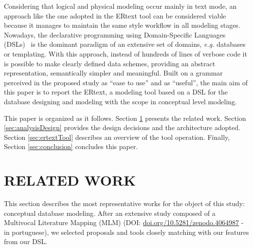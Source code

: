 \documentclass[a4paper,twoside,anonymous]{article}
\begin{document}
Considering that logical and physical modeling occur mainly in text mode, an approach like the one adopted in the ERtext tool can be considered viable because it manages to maintain the same style workflow in all modeling stages.
Nowadays, the declarative programming using Domain-Specific Languages (DSLs)~\cite{Kelly08} is the dominant paradigm of an extensive set of domains, \textit{e.g.} databases or templating.
With this approach, instead of hundreds of lines of verbose code it is possible to make clearly defined data schemes, providing an abstract representation, semantically simpler and meaningful.
Built on a grammar perceived in the proposed study as ``ease to use'' and as ``useful'', the main aim of this paper is to report the ERtext, a modeling tool based on a DSL for the database designing and modeling with the scope in conceptual level modeling.

This paper is organized as it follows.
Section \ref{sec:relatedWork} presents the related work. 
Section \ref{sec:analysisDesign} provides the design decisions and the architecture adopted. %
Section \ref{sec:ertextTool} describes an overview of the tool operation.
Finally, Section \ref{sec:conclusion} concludes this paper.

\section{\uppercase{Related Work}} 
\label{sec:relatedWork}

This section describes the most representative works for the object of this study: conceptual database modeling.
After an extensive study composed of a Multivocal Literature Mapping (MLM) (DOI: \url{doi.org/10.5281/zenodo.4064987} - in portuguese), we selected proposals and tools closely matching with our features from our DSL.
\end{document}

